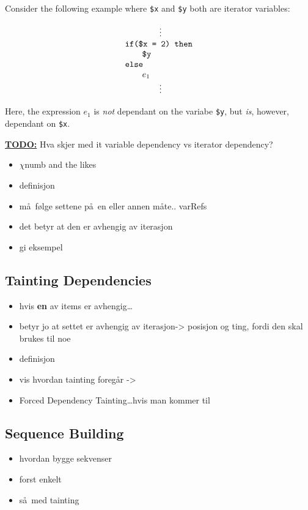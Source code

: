 Consider the following example where \texttt{\$x} and \texttt{\$y} both are iterator variables:
\begin{center}
\begin{equation*}
\begin{array}{l}
\qquad \qquad \vdots \\
\mbox{\texttt{if(\$x = 2) then}} \\ \qquad
	\mbox{\texttt{\$y}} \\ 
\mbox{\texttt{else}} \\ \qquad 
	e_{1} \\
\qquad \qquad \vdots
\end{array}
\end{equation*}
\end{center}

Here, the expression $e_{1}$ is \textit{not} dependant on the variabe \texttt{\$y}, but \textit{is}, however,
dependant on \texttt{\$x}.

\underline{\textbf{\Large TODO:}} Hva skjer med it variable dependency vs iterator dependency?

\begin{itemize}
  \item $\chi$numb and the likes
  \item definisjon
  \item m\aa~f\o lge settene p\aa~en eller annen m\aa te.. varRefs
  \item det betyr at den er avhengig av iterasjon
  \item gi eksempel
\end{itemize}

\subsection{Tainting Dependencies}
\label{sect:trans:TD:tainting}
\begin{itemize}
  \item hvis \textbf{en} av items er avhengig\ldots
  \item betyr jo at settet er avhengig av iterasjon-> posisjon og ting, fordi den skal brukes til noe
  \item definisjon
  \item vis hvordan tainting foreg\aa r ->
  \item Forced Dependency Tainting\ldots hvis man kommer til 
\end{itemize}

\subsection{Sequence Building}
\label{sect:trans:TD:seqBuild}
\begin{itemize}
  \item hvordan bygge sekvenser
  \item forst enkelt
  \item s\aa~med tainting
\end{itemize}

